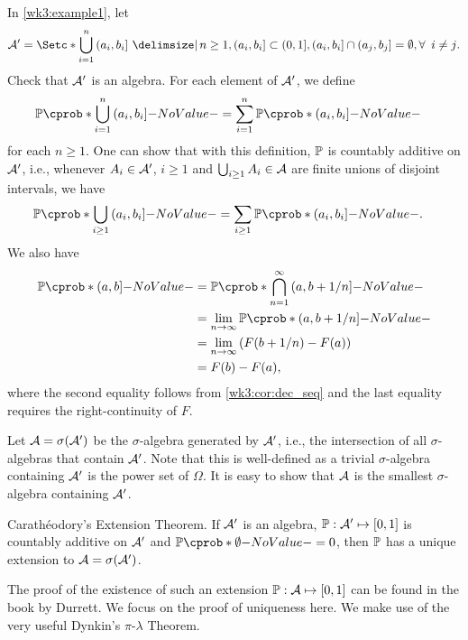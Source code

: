 \documentclass[12pt]{article}
\begin{document}
In \cref{wk3:example1}, let 
\begin{align*}
\calA' = \set*{\bigcup\limits_{i=1}^{n} \left(a_i, b_i\right] \given n \geq 1, \left(a_i, b_i\right] \subset (0, 1], \left(a_i, b_i\right] \cap \left(a_j, b_j\right] = \emptyset, \forall\ i \neq j}. 
\end{align*}
Check that $\mathcal{A}'$ is an algebra. For each element of $\mathcal{A}'$, we define
\begin{align*}
\P(\bigcup\limits_{i=1}^{n} {(a_i, b_i]}) &= \sum_{i=1}^n \P({(a_i, b_i]})
\end{align*}
for each $n\geq1$. One can show that with this definition, $\P$ is countably additive on $\mathcal{A}'$, i.e., whenever $A_i \in \mathcal{A}'$, $i\geq 1$ and $\bigcup_{i\geq 1} A_i \in \mathcal{A}$ are finite unions of disjoint intervals, we have
\begin{align*}
\P(\bigcup\limits_{i\geq 1} {(a_i, b_i]}) &= \sum_{i\geq 1} \P({(a_i, b_i]}).
\end{align*}
We also have
\begin{align*}
\P({(a, b]}) 
&= \P(\bigcap\limits_{n=1}^{\infty} {(a, b + 1/n ]}) \\
&= \lim_{n \to \infty} \P({(a, b + 1/n]}) \\
&= \lim_{n \to \infty} \left(F(b+1/n) - F(a) \right) \\
&= F(b) - F(a),
\end{align*}
where the second equality follows from \cref{wk3:cor:dec_seq} and the last equality requires the right-continuity of $F$. 

Let $\mathcal{A} = \sigma(\mathcal{A}')$ be the $\sigma$-algebra generated by $\mathcal{A}'$, i.e., the intersection of all $\sigma$-algebras that contain $\mathcal{A}'$. Note that this is well-defined as a trivial $\sigma$-algebra containing $\mathcal{A}'$ is the power set of $\Omega$. It is easy to show that $\mathcal{A}$ is the smallest $\sigma$-algebra containing $\mathcal{A}'$.

\begin{Theorem}\label{Caratheodory Theorem}
Carath{\'e}odory's Extension Theorem. If $\mathcal{A}'$ is an algebra, $\P : \calA' \mapsto [0, 1]$ is countably additive on $\mathcal{A}'$ and $\P(\emptyset)=0$, then $\P$ has a unique extension to $\mathcal{A} = \sigma(\mathcal{A}')$.
\end{Theorem}
%

The proof of the existence of such an extension $\P: \calA \mapsto [0,1]$ can be found in the book by Durrett. We focus on the proof of uniqueness here. We make use of the very useful Dynkin's $\pi$-$\lambda$ Theorem.
\end{document}
